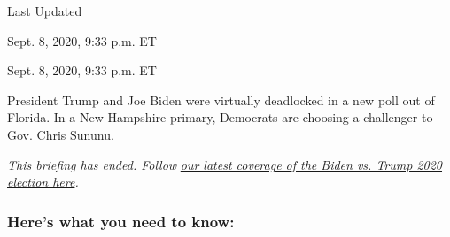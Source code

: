 Last Updated

Sept. 8, 2020, 9:33 p.m. ET

Sept. 8, 2020, 9:33 p.m. ET

President Trump and Joe Biden were virtually deadlocked in a new poll
out of Florida. In a New Hampshire primary, Democrats are choosing a
challenger to Gov. Chris Sununu.

\emph{This briefing has ended. Follow}
\href{https://www.nytimes3xbfgragh.onion/news-event/2020-election}{\emph{our
latest coverage of the Biden vs. Trump 2020 election here}}\emph{.}

\hypertarget{heres-what-you-need-to-know}{%
\subsubsection{Here's what you need to
know:}\label{heres-what-you-need-to-know}}

